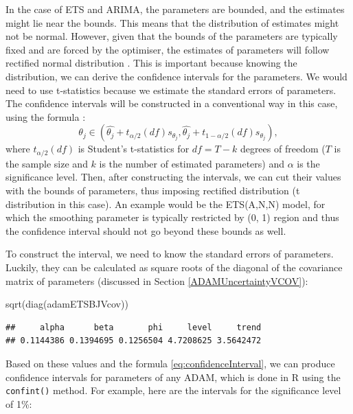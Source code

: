 \documentclass[
]{book}
\newenvironment{Shaded}{\begin{snugshade}}{\end{snugshade}}
\newcommand{\FunctionTok}[1]{\textcolor[rgb]{0.00,0.00,0.00}{#1}}
\newcommand{\NormalTok}[1]{#1}
\theoremstyle{definition}
\theoremstyle{definition}
\theoremstyle{definition}
\theoremstyle{definition}
\theoremstyle{remark}
\begin{document}
In the case of ETS and ARIMA, the parameters are bounded, and the estimates might lie near the bounds. This means that the distribution of estimates might not be normal. However, given that the bounds of the parameters are typically fixed and are forced by the optimiser, the estimates of parameters will follow rectified normal distribution \citep{WikipediaRectifiedNormal}. This is important because knowing the distribution, we can derive the confidence intervals for the parameters. We would need to use t-statistics because we estimate the standard errors of parameters. The confidence intervals will be constructed in a conventional way in this case, using the formula \citep[see Section 5.1 of][]{SvetunkovSBA}:
\begin{equation}
    \theta_j \in (\hat{\theta_j} + t_{\alpha/2}(df) s_{\theta_j}, \hat{\theta_j} + t_{1-\alpha/2}(df) s_{\theta_j}), 
    \label{eq:confidenceInterval}
\end{equation}
where \(t_{\alpha/2}(df)\) is Student's t-statistics for \(df=T-k\) degrees of freedom (\(T\) is the sample size and \(k\) is the number of estimated parameters) and \(\alpha\) is the significance level. Then, after constructing the intervals, we can cut their values with the bounds of parameters, thus imposing rectified distribution (t distribution in this case). An example would be the ETS(A,N,N) model, for which the smoothing parameter is typically restricted by (0, 1) region and thus the confidence interval should not go beyond these bounds as well.

To construct the interval, we need to know the standard errors of parameters. Luckily, they can be calculated as square roots of the diagonal of the covariance matrix of parameters (discussed in Section \ref{ADAMUncertaintyVCOV}):

\begin{Shaded}
\begin{Highlighting}[]
\FunctionTok{sqrt}\NormalTok{(}\FunctionTok{diag}\NormalTok{(adamETSBJVcov))}
\end{Highlighting}
\end{Shaded}

\begin{verbatim}
##     alpha      beta       phi     level     trend 
## 0.1144386 0.1394695 0.1256504 4.7208625 3.5642472
\end{verbatim}

Based on these values and the formula \eqref{eq:confidenceInterval}, we can produce confidence intervals for parameters of any ADAM, which is done in R using the \texttt{confint()} method. For example, here are the intervals for the significance level of 1\%:
\end{document}
